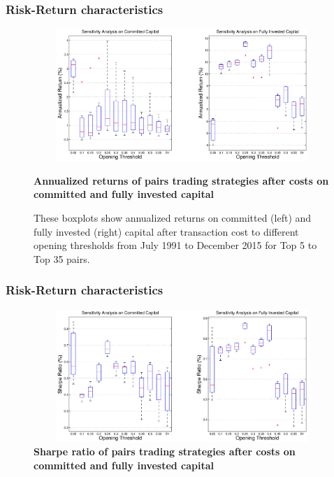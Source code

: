 \documentclass[pdf,9pt,xcolor=dvipsnames,hide notes]{beamer}
\begin{document}
\begin{frame}
	\frametitle{Risk-Return characteristics}
	
	\begin{figure}[!ht]
		\centering
		\includegraphics[width=12cm,height=5cm]{Figure1.eps}
		\captionsetup{justification=raggedright,
			singlelinecheck=false
		}
		\caption{\textbf{Annualized returns of pairs trading strategies after costs on committed and fully invested capital}}
		\caption*{\scriptsize These boxplots show annualized returns on committed (left) and fully invested (right) capital after transaction cost to different opening thresholds from July 1991 to December 2015 for Top 5 to Top 35 pairs.}
		\label{fig:fig1}
	\end{figure}

\end{frame}

\begin{frame}
	\frametitle{Risk-Return characteristics}
	
	\begin{figure}[!ht]
		\centering
		\includegraphics[width=12cm,height=5cm]{Figure2.eps}
		\captionsetup{justification=raggedright,
			singlelinecheck=false
		}
		\caption{\textbf {Sharpe ratio of pairs trading strategies after costs on committed and fully invested capital}}
		\label{fig:fig2}
	\end{figure}
	
\end{frame}
\end{document}

